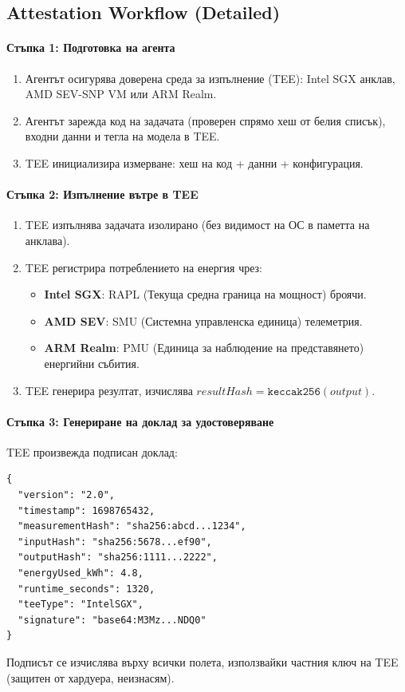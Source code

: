 \documentclass[11pt]{article}
\begin{document}
\subsection{Attestation Workflow (Detailed)}
\label{sec:attestation-workflow}
\paragraph{Стъпка 1: Подготовка на агента}
\begin{enumerate}[noitemsep]
  \item Агентът осигурява доверена среда за изпълнение (TEE): Intel SGX анклав, AMD SEV-SNP VM или ARM Realm.
  \item Агентът зарежда код на задачата (проверен спрямо хеш от белия списък), входни данни и тегла на модела в TEE.
  \item TEE инициализира измерване: хеш на код + данни + конфигурация.
\end{enumerate}

\paragraph{Стъпка 2: Изпълнение вътре в TEE}
\begin{enumerate}[noitemsep]
  \item TEE изпълнява задачата изолирано (без видимост на ОС в паметта на анклава).
  \item TEE регистрира потреблението на енергия чрез:
    \begin{itemize}[noitemsep]
      \item \textbf{Intel SGX}: RAPL (Текуща средна граница на мощност) броячи.
      \item \textbf{AMD SEV}: SMU (Системна управленска единица) телеметрия.
      \item \textbf{ARM Realm}: PMU (Единица за наблюдение на представянето) енергийни събития.
    \end{itemize}
  \item TEE генерира резултат, изчислява $resultHash = \texttt{keccak256}(output)$.
\end{enumerate}

\paragraph{Стъпка 3: Генериране на доклад за удостоверяване}
TEE произвежда подписан доклад:
\begin{verbatim}
{
  "version": "2.0",
  "timestamp": 1698765432,
  "measurementHash": "sha256:abcd...1234",
  "inputHash": "sha256:5678...ef90",
  "outputHash": "sha256:1111...2222",
  "energyUsed_kWh": 4.8,
  "runtime_seconds": 1320,
  "teeType": "IntelSGX",
  "signature": "base64:M3Mz...NDQ0"
}
\end{verbatim}
Подписът се изчислява върху всички полета, използвайки частния ключ на TEE (защитен от хардуера, неизнасям).
\end{document}
